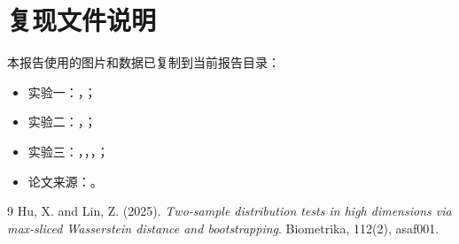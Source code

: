 \documentclass[UTF8,a4paper,11pt]{ctexart}
\begin{document}
\section{复现文件说明}

本报告使用的图片和数据已复制到当前报告目录：

\begin{itemize}
  \item 实验一：，；
  \item 实验二：，；
  \item 实验三：，，，；
  \item 论文来源：。
\end{itemize}

\begin{thebibliography}{9}
Hu, X. and Lin, Z. (2025).
\textit{Two-sample distribution tests in high dimensions via max-sliced Wasserstein distance and bootstrapping}.
Biometrika, 112(2), asaf001.
\end{thebibliography}
\end{document}
